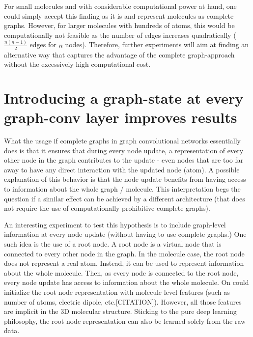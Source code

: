 For small molecules and with considerable computational power at hand, one could simply accept this finding as it is and represent molecules as complete graphs. However, for larger molecules with hundreds of atoms, this would be computationally not feasible as the number of edges increases quadratically ($\frac{n(n - 1)}{2}$ edges for $n$ nodes). Therefore, further experiments will aim at finding an alternative way that captures the advantage of the complete graph-approach without the excessively high computational cost.



\section{Introducing a graph-state at every graph-conv layer improves results}


What the usage if complete graphs in graph convolutional networks essentially does is that it ensures that during every node update, a representation of every other node in the graph contributes to the update - even nodes that are too far away to have any direct interaction with the updated node (atom).
A possible explanation of this behavior is that the node update benefits from having access to information about the whole graph / molecule. This interpretation begs the question if a similar effect can be achieved by a different architecture (that does not require the use of computationally prohibitive complete graphs).

An interesting experiment to test this hypothesis is to include graph-level information at every node update (without having to use complete graphs.) One such idea is the use of a root node. A root node is a virtual node that is connected to every other node in the graph. In the molecule case, the root node does not represent a real atom. Instead, it can be used to represent information about the whole molecule. Then, as every node is connected to the root node, every node update has access to information about the whole molecule. On could initialize the root node representation with molecule level features (such as number of atoms, electric dipole, etc.[CITATION]). However, all those features are implicit in the 3D molecular structure. Sticking to the pure deep learning philosophy, the root node representation can also be learned solely from the raw data.

